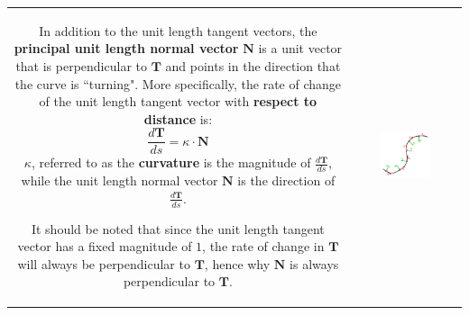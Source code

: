 \documentclass{article}
\begin{document}
\begin{tabular}{cc}
\parbox{0.5\textwidth}{ 
In addition to the unit length tangent vectors, the {\bf principal unit length normal vector} \(\mathbf{N}\) is a unit vector that is perpendicular to \(\mathbf{T}\) and points in the direction that the curve is ``turning". More specifically, the rate of change of the unit length tangent vector with {\bf respect to distance} is:
\[\frac{d\mathbf{T}}{ds} = \kappa \cdot \mathbf{N}\] 
\(\kappa\), referred to as the {\bf curvature} is the magnitude of \(\frac{d\mathbf{T}}{ds}\), while the unit length normal vector \(\mathbf{N}\) is the direction of \(\frac{d\mathbf{T}}{ds}\). 

It should be noted that since the unit length tangent vector has a fixed magnitude of \(1\), the rate of change in \(\mathbf{T}\) will always be perpendicular to \(\mathbf{T}\), hence why \(\mathbf{N}\) is always perpendicular to \(\mathbf{T}\).
} & \parbox{0.5\textwidth}{
\includegraphics[width = 0.5\textwidth]{unit_tangents_and_unit_normals}
}
\end{tabular}
\end{document}
